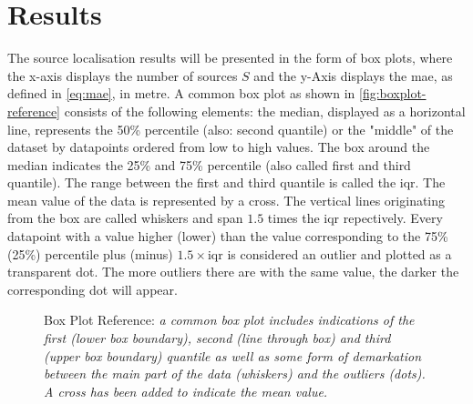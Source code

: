 \setcounter{topnumber}{2}
\setcounter{bottomnumber}{2}
\setcounter{totalnumber}{4}
\renewcommand{\topfraction}{0.85}
\renewcommand{\bottomfraction}{0.85}
\renewcommand{\textfraction}{0.15}
\renewcommand{\floatpagefraction}{0.8}
\renewcommand{\textfraction}{0.1}
\setlength{\floatsep}{5pt plus 2pt minus 2pt}
\setlength{\textfloatsep}{5pt plus 2pt minus 2pt}

\setlength\figureheight{7cm}
\setlength\figurewidth{\textwidth}

\section{Results}
\label{chap:results}

The source localisation results will be presented in the form of box plots, where the x-axis displays the number of sources $S$ and the y-Axis displays the \gls{mae}, as defined in \eqref{eq:mae}, in metre. A common box plot as shown in \autoref{fig:boxplot-reference} consists of the following elements: the median, displayed as a horizontal line, represents the 50\% percentile (also: second quantile) or the "middle" of the dataset by datapoints ordered from low to high values. The box around the median indicates the 25\% and 75\% percentile (also called first and third quantile). The range between the first and third quantile is called the \gls{iqr}. The mean value of the data is represented by a cross. The vertical lines originating from the box are called whiskers and span $1.5$ times the \gls{iqr} repectively. Every datapoint with a value higher (lower) than the value corresponding to the 75\% (25\%) percentile plus (minus) $1.5\times$\gls{iqr} is considered an outlier and plotted as a transparent dot. The more outliers there are with the same value, the darker the corresponding dot will appear.

\begin{figure}[!bht]
	\setlength\figurewidth{5cm}
	\iftoggle{quick}{%
		\texttt{[image: plots/boxplots/boxplot-reference-sc]}
	}{%
		
	}
	\caption[Box Plot Reference]{Box Plot Reference: \itshape a common box plot includes indications of the first (lower box boundary), second (line through box) and third (upper box boundary) quantile as well as some form of demarkation between the main part of the data (whiskers) and the outliers (dots). A cross has been added to indicate the mean value.}
	\label{fig:boxplot-reference}
\end{figure}




